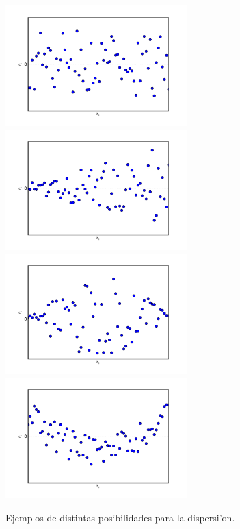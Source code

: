 \documentclass[a4paper]{report}
\begin{document}
\begin{figure}[h!]
\begin{center}
\includegraphics[width=7cm]{figs/fig-dispersion-01.pdf}\includegraphics[width=7cm]{figs/fig-dispersion-02.pdf}\\
\includegraphics[width=7cm]{figs/fig-dispersion-03.pdf}\includegraphics[width=7cm]{figs/fig-dispersion-04.pdf}
\caption{Ejemplos de distintas posibilidades para la dispersi'on.}
\end{center}
\label{fig-disp}
\end{figure}
\end{document}
